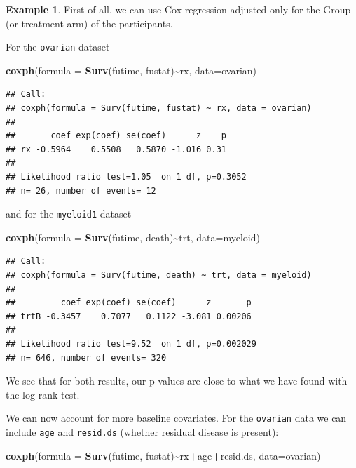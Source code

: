 \documentclass[
  openany]{book}
\newenvironment{Shaded}{\begin{snugshade}}{\end{snugshade}}
\newcommand{\AttributeTok}[1]{\textcolor[rgb]{0.13,0.29,0.53}{#1}}
\newcommand{\FunctionTok}[1]{\textcolor[rgb]{0.13,0.29,0.53}{\textbf{#1}}}
\newcommand{\NormalTok}[1]{#1}
\newcommand{\SpecialCharTok}[1]{\textcolor[rgb]{0.81,0.36,0.00}{\textbf{#1}}}
\theoremstyle{definition}
\theoremstyle{definition}
\newtheorem{example}{Example}[chapter]
\theoremstyle{definition}
\theoremstyle{definition}
\theoremstyle{remark}
\begin{document}
\begin{example}
First of all, we can use Cox regression adjusted only for the Group (or treatment arm) of the participants.

For the \texttt{ovarian} dataset

\begin{Shaded}
\begin{Highlighting}[]
\FunctionTok{coxph}\NormalTok{(}\AttributeTok{formula =} \FunctionTok{Surv}\NormalTok{(futime, fustat)}\SpecialCharTok{\textasciitilde{}}\NormalTok{rx, }\AttributeTok{data=}\NormalTok{ovarian)}
\end{Highlighting}
\end{Shaded}

\begin{verbatim}
## Call:
## coxph(formula = Surv(futime, fustat) ~ rx, data = ovarian)
## 
##       coef exp(coef) se(coef)      z    p
## rx -0.5964    0.5508   0.5870 -1.016 0.31
## 
## Likelihood ratio test=1.05  on 1 df, p=0.3052
## n= 26, number of events= 12
\end{verbatim}

and for the \texttt{myeloid1} dataset

\begin{Shaded}
\begin{Highlighting}[]
\FunctionTok{coxph}\NormalTok{(}\AttributeTok{formula =} \FunctionTok{Surv}\NormalTok{(futime, death)}\SpecialCharTok{\textasciitilde{}}\NormalTok{trt, }\AttributeTok{data=}\NormalTok{myeloid)}
\end{Highlighting}
\end{Shaded}

\begin{verbatim}
## Call:
## coxph(formula = Surv(futime, death) ~ trt, data = myeloid)
## 
##         coef exp(coef) se(coef)      z       p
## trtB -0.3457    0.7077   0.1122 -3.081 0.00206
## 
## Likelihood ratio test=9.52  on 1 df, p=0.002029
## n= 646, number of events= 320
\end{verbatim}

We see that for both results, our p-values are close to what we have found with the log rank test.

We can now account for more baseline covariates. For the \texttt{ovarian} data we can include \texttt{age} and \texttt{resid.ds} (whether residual disease is present):

\begin{Shaded}
\begin{Highlighting}[]
\FunctionTok{coxph}\NormalTok{(}\AttributeTok{formula =} \FunctionTok{Surv}\NormalTok{(futime, fustat)}\SpecialCharTok{\textasciitilde{}}\NormalTok{rx}\SpecialCharTok{+}\NormalTok{age}\SpecialCharTok{+}\NormalTok{resid.ds, }\AttributeTok{data=}\NormalTok{ovarian)}
\end{Highlighting}
\end{Shaded}


\end{example}
\end{document}
